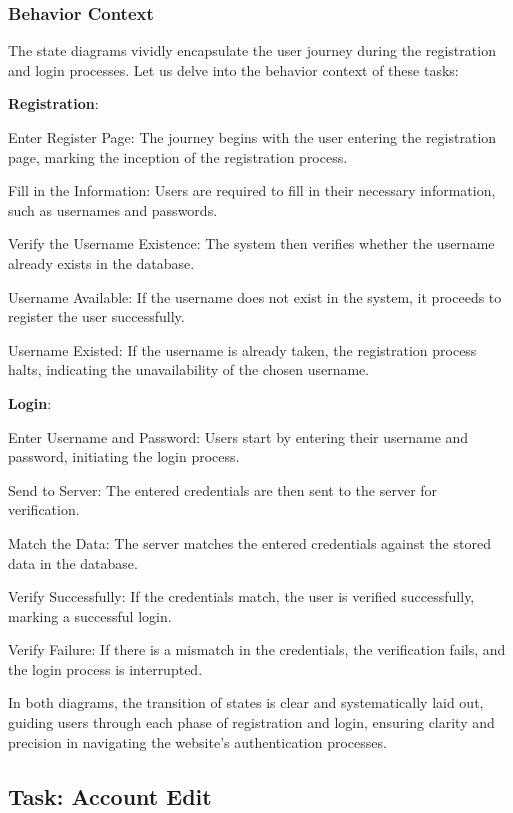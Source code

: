 \documentclass[conference]{IEEEtran}
\begin{document}
\subsubsection{\textbf{Behavior Context}}
\textbf{}

The state diagrams vividly encapsulate the user journey during the registration and login processes. Let us delve into the behavior context of these tasks:

\textbf{Registration}:

Enter Register Page: The journey begins with the user entering the registration page, marking the inception of the registration process.

Fill in the Information: Users are required to fill in their necessary information, such as usernames and passwords.

Verify the Username Existence: The system then verifies whether the username already exists in the database.

Username Available: If the username does not exist in the system, it proceeds to register the user successfully.

Username Existed: If the username is already taken, the registration process halts, indicating the unavailability of the chosen username.

\textbf{Login}:

Enter Username and Password: Users start by entering their username and password, initiating the login process.

Send to Server: The entered credentials are then sent to the server for verification.

Match the Data: The server matches the entered credentials against the stored data in the database.

Verify Successfully: If the credentials match, the user is verified successfully, marking a successful login.

Verify Failure: If there is a mismatch in the credentials, the verification fails, and the login process is interrupted.

In both diagrams, the transition of states is clear and systematically laid out, guiding users through each phase of registration and login, ensuring clarity and precision in navigating the website’s authentication processes.


\subsection{\textbf{Task: Account Edit }}
\end{document}
